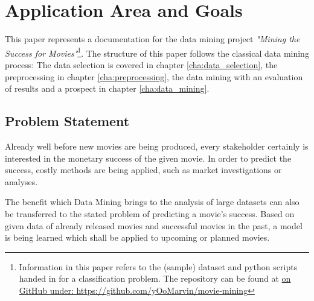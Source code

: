 \chapter{Application Area and Goals}
\label{cha:area_goals}
This paper represents a documentation for the data mining project \textit{"Mining the Success for Movies"}\footnote{Information in this paper refers to the (sample) dataset and python scripts handed in for a classification problem. The repository can be found at \hyperref{https://github.com/yOoMarvin/movie-mining}{external}{github}{on GitHub under: https://github.com/yOoMarvin/movie-mining}}. The structure of this paper follows the classical data mining process: The data selection is covered in chapter \ref{cha:data_selection}, the preprocessing in chapter \ref{cha:preprocessing}, the data mining with an evaluation of results and a prospect in chapter \ref{cha:data_mining}.


\section{Problem Statement}
Already well before new movies are being produced, every stakeholder certainly is interested in the monetary success of the given movie. In order to predict the success, costly methods are being applied, such as market investigations or analyses.

The benefit which Data Mining brings to the analysis of large datasets can also be transferred to the stated problem of predicting a movie's success. Based on given data of already released movies and successful movies in the past, a model is being learned which shall be applied to upcoming or planned movies. %

